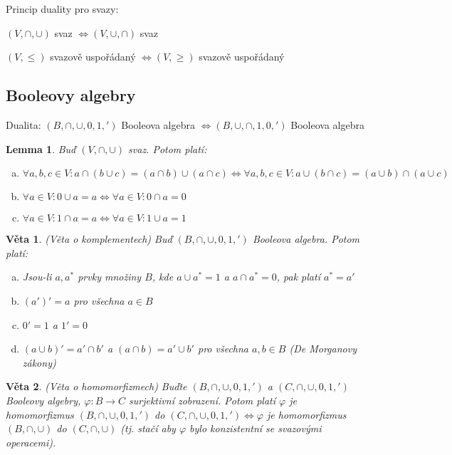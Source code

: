 \documentclass[a4paper, 11pt]{report}
\newtheorem{veta}{Věta}[chapter]
\newtheorem{lemma}{Lemma}[chapter]
\begin{document}
Princip duality pro svazy:

$(V, \cap, \cup)$ svaz $\Leftrightarrow (V, \cup, \cap)$ svaz

$(V, \leq)$ svazově uspořádaný $\Leftrightarrow (V, \geq)$ svazově uspořádaný

\subsection{Booleovy algebry}

Dualita: $(B, \cap, \cup, 0, 1, ')$ Booleova algebra $\Leftrightarrow (B, \cup, \cap, 1, 0, ')$ Booleova algebra

\begin{lemma}
Buď $(V, \cap, \cup)$ svaz. Potom platí:
\begin{enumerate}[a)]
	\item $\forall a,b,c \in V: a \cap (b \cup c) = (a \cap b) \cup (a \cap c) \Leftrightarrow \forall a, b, c \in V: a \cup (b \cap c) = (a \cup b) \cap (a \cup c)$
	\item $\forall a \in V: 0 \cup a = a \Leftrightarrow \forall a \in V: 0 \cap a = 0$
	\item $\forall a \in V: 1 \cap a = a \Leftrightarrow \forall a \in V: 1 \cup a = 1$
\end{enumerate}
\end{lemma}

\begin{veta}
(Věta o komplementech) Buď $(B, \cap, \cup, 0, 1, ')$ Booleova algebra. Potom platí:
\begin{enumerate}[a)]
	\item Jsou-li $a, a^*$ prvky množiny $B$, kde $a \cup a^* = 1$ a $a \cap a^* = 0$, pak platí $a^* = a'$
	\item $(a')' = a$ pro všechna $a \in B$
	\item $0' = 1$ a $1' = 0$
	\item $(a \cup b)' = a' \cap b'$ a $(a \cap b) = a' \cup b'$ pro všechna $a, b \in B$ (De Morganovy zákony)
\end{enumerate}
\end{veta}

\begin{veta}
(Věta o homomorfizmech) Buďte $(B, \cap, \cup, 0, 1, ')$ a $(C, \cap, \cup, 0, 1, ')$ Booleovy algebry, $\varphi: B \to C$ surjektivní zobrazení. Potom platí $\varphi$ je homomorfizmus $(B, \cap, \cup, 0, 1, ')$ do $(C, \cap, \cup, 0, 1, ') \Leftrightarrow \varphi$ je homomorfizmus $(B, \cap, \cup)$ do $(C, \cap, \cup)$ (tj. stačí aby $\varphi$ bylo konzistentní se svazovými operacemi).
\end{veta}
\end{document}
